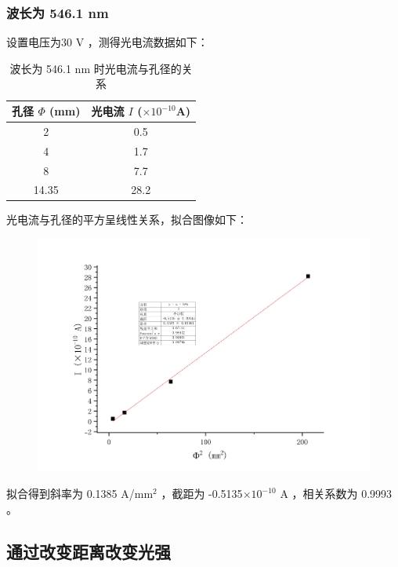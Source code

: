 \documentclass[a4paper]{extarticle}
\begin{document}
    \subsubsection{波长为 546.1 nm}
    设置电压为30 V ，测得光电流数据如下：
    \begin{table}[H]
        \centering
        \caption{波长为 546.1 nm 时光电流与孔径的关系}
        \begin{tabular}{cc}
            \toprule
            孔径 $\Phi$ (mm) & 光电流 $I$ ($\times10^{-10}$A)\\
            \midrule
            2 & 0.5\\
            4 & 1.7\\
            8 & 7.7\\
            14.35 & 28.2\\
            \bottomrule
        \end{tabular}
    \end{table}
    光电流与孔径的平方呈线性关系，拟合图像如下：
    \begin{figure}[H]
        \centering
        \includegraphics[width=0.8\linewidth]{4.png}
    \end{figure}
    拟合得到斜率为 0.1385 A/mm$^2$ ，截距为 -0.5135$\times10^{-10}$ A ，相关系数为 0.9993 。
    \subsection{通过改变距离改变光强}
\end{document}
